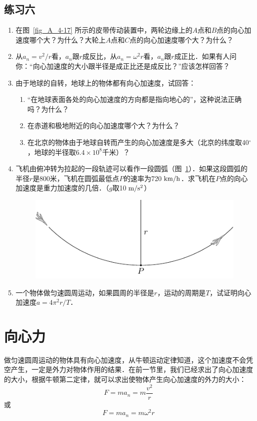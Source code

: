 \subsection*{练习六}
\begin{enumerate}
	\item 在图~\ref{fig_A_4-17} 所示的皮带传动装置中，两轮边缘上的$A$点和$B$点的向心加速度哪个大？为什么？大轮上$A$点和$C$点的向心加速度哪个大？为什么？
	\item 从$a_n=v^2/r$看，$a_n$跟$r$成反比，从$a_n=\omega^2r$看，$a_n$跟$r$成正比．如果有人问你：“向心加速度的大小跟半径是成正比还是成反比？”应该怎样回答？
	\item 由于地球的自转，地球上的物体都有向心加速度，试回答：
\begin{enumerate}
	\item “在地球表面各处的向心加速度的方向都是指向地心的”，这种说法正确吗？为什么？
	\item 在赤道和极地附近的向心加速度哪个大？为什么？
	\item 在北京的物体由于地球自转而产生的向心加速度是多大（北京的纬度取40$^\circ$，地球的半径取$6.4\times 10^8$千米）？	
\end{enumerate}
\item	 飞机由俯冲转为拉起的一段轨迹可以看作一段圆弧（图~\ref{fig_A_4-19}）．如果这段圆弧的半径$r$是800米，飞机在圆弧最低点$P$的速率为720$\;\text{km}/\text{h}$．求飞机在$P$点的向心加速度是重力加速度的几倍．（$g$取10$\;\text{m}/\text{s}^2$）
\begin{figure}[htbp]
    \centering
    \includegraphics{fig/A/4-19.pdf}
    \caption{}\label{fig_A_4-19}
\end{figure}

	\item 一个物体做匀速圆周运动，如果圆周的半径是$r$，运动的周期是$T$，试证明向心加速度$a=4\pi^2r/T$．
\end{enumerate}

\section{向心力}
做匀速圆周运动的物体具有向心加速度，从牛顿运动定律知道，这个加速度不会凭空产生，一定是外力对物体作用的结果．在前一节里，我们已经求出了向心加速度的大小，根据牛顿第二定律，就可以求出使物体产生向心加速度的外力的大小：
\[F=ma_n=m\frac{v^2}{r} \]
或
\[F=ma_n=m\omega^2 r \]

